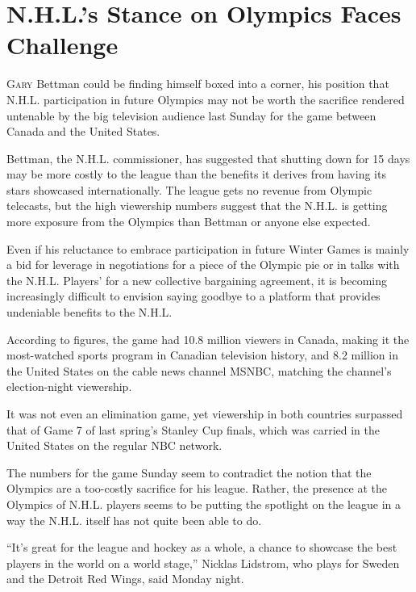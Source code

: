 ﻿\documentclass[12pt]{article}
\begin{document}
\section{N.H.L.'s Stance on Olympics Faces Challenge}

\lettrine{G}{ary} Bettman could be finding himself boxed into a corner, his
position that N.H.L. participation in future Olympics may not be worth the sacrifice rendered
untenable by the big television audience last Sunday for the game between Canada and the United
States.

Bettman, the N.H.L. commissioner, has suggested that shutting down for 15 days may be more costly to
the league than the benefits it derives from having its stars showcased internationally. The league
gets no revenue from Olympic telecasts, but the high viewership numbers suggest that the N.H.L. is
getting more exposure from the Olympics than Bettman or anyone else expected.


Even if his reluctance to embrace participation in future Winter Games is mainly a bid for leverage
in negotiations for a piece of the Olympic pie or in talks with the N.H.L. Players' for a new
collective bargaining agreement, it is becoming increasingly difficult to envision saying goodbye to
a platform that provides undeniable benefits to the N.H.L.

According to figures, the game had 10.8 million viewers in Canada, making it the most-watched sports
program in Canadian television history, and 8.2 million in the United States on the cable news
channel MSNBC, matching the channel's election-night viewership.

It was not even an elimination game, yet viewership in both countries surpassed that of Game 7 of
last spring's Stanley Cup finals, which was carried in the United States on the regular NBC network.

The numbers for the game Sunday seem to contradict the notion that the Olympics are a too-costly
sacrifice for his league. Rather, the presence at the Olympics of N.H.L. players seems to be putting
the spotlight on the league in a way the N.H.L. itself has not quite been able to do.

``It's great for the league and hockey as a whole, a chance to showcase the best players in the
world on a world stage,'' Nicklas Lidstrom, who plays for Sweden and the Detroit Red Wings, said
Monday night.
\end{document}
